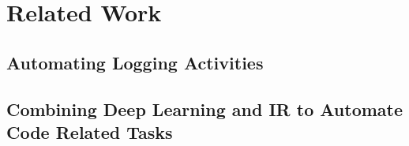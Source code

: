 \section{Related Work} \label{sec:related}

\subsection{Automating Logging Activities}


\subsection{Combining Deep Learning and IR to Automate Code Related Tasks}